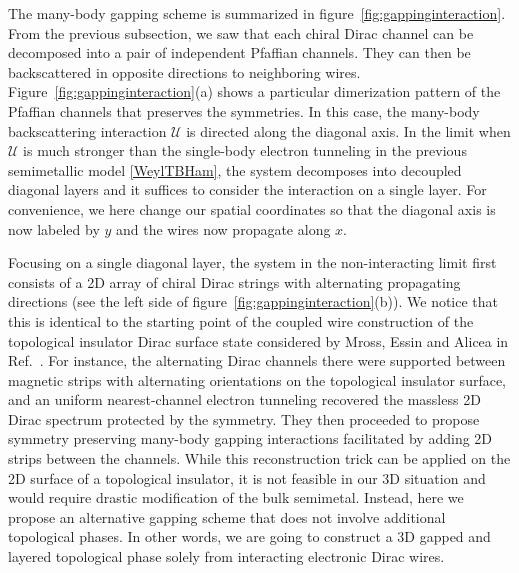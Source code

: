 The many-body gapping scheme is summarized in figure~\ref{fig:gappinginteraction}. From the previous subsection, we saw that each chiral Dirac channel can be decomposed into a pair of independent Pfaffian channels. They can then be backscattered in opposite directions to neighboring wires. Figure~\ref{fig:gappinginteraction}(a) shows a particular dimerization pattern of the Pfaffian channels that preserves the symmetries. In this case, the many-body backscattering interaction $\mathcal{U}$ is directed along the diagonal axis. In the limit when $\mathcal{U}$ is much stronger than the single-body electron tunneling in the previous semimetallic model \eqref{WeylTBHam}, the system decomposes into decoupled diagonal layers and it suffices to consider the interaction on a single layer. For convenience, we here change our spatial coordinates so that the diagonal axis is now labeled by $y$ and the wires now propagate along $x$.

Focusing on a single diagonal layer, the system in the non-interacting limit first consists of a 2D array of chiral Dirac strings with alternating propagating directions (see the left side of figure~\ref{fig:gappinginteraction}(b)). We notice that this is identical to the starting point of the coupled wire construction of the topological insulator Dirac surface state considered by Mross, Essin and Alicea in Ref.~. For instance, the alternating Dirac channels there were supported between magnetic strips with alternating orientations on the topological insulator surface, and an uniform nearest-channel electron tunneling recovered the massless 2D Dirac spectrum protected by the \AFTR symmetry. They then proceeded to propose symmetry preserving many-body gapping interactions facilitated by adding 2D \FQH strips between the channels. While this reconstruction trick can be applied on the 2D surface of a topological insulator, it is not feasible in our 3D situation and would require drastic modification of the bulk semimetal. Instead, here we propose an alternative gapping scheme that does not involve additional topological phases. In other words, we are going to construct a 3D gapped and layered topological phase solely from interacting electronic Dirac wires.


